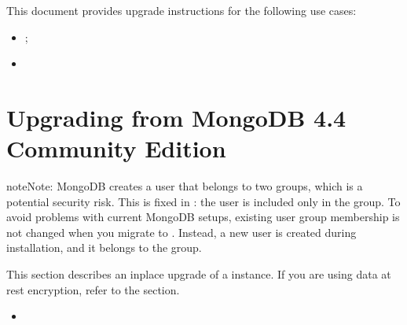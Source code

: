 \documentclass[letterpaper,10pt,english]{sphinxmanual}
\begin{document}
\sphinxAtStartPar
This document provides upgrade instructions for the following use cases:
\begin{itemize}
\item {} 
\sphinxAtStartPar
{\hyperref[\detokenize{install/upgrade-from-mongodb:upgrade-from-mongodb}]{}};

\item {} 
\sphinxAtStartPar
{\hyperref[\detokenize{install/upgrade-from-mongodb:minor-upgrade}]{}}

\end{itemize}


\section{Upgrading from MongoDB 4.4 Community Edition}
\label{\detokenize{install/upgrade-from-mongodb:upgrading-from-mongodb-ce}}\label{\detokenize{install/upgrade-from-mongodb:upgrade-from-mongodb}}
\begin{sphinxadmonition}{note}{Note:}
\sphinxAtStartPar
MongoDB creates a user that belongs to two groups, which is a potential
security risk.  This is fixed in : the user is included only in the
 group.  To avoid problems with current MongoDB setups, existing
user group membership is not changed when you migrate to .  Instead, a
new  user is created during installation, and it belongs to the
 group.
\end{sphinxadmonition}

\sphinxAtStartPar
This section describes an in\sphinxhyphen{}place upgrade of a  instance. If you are using data at rest encryption, refer to the {\hyperref[\detokenize{install/upgrade-from-mongodb:upgrade-encryption}]{}} section.

\begin{sphinxShadowBox}
\begin{itemize}
\item {} 
\sphinxAtStartPar
{}\label{\detokenize{install/upgrade-from-mongodb:id1}}{\hyperref[\detokenize{install/upgrade-from-mongodb:prerequisites}]{}}

\end{itemize}
\end{sphinxShadowBox}
\end{document}
